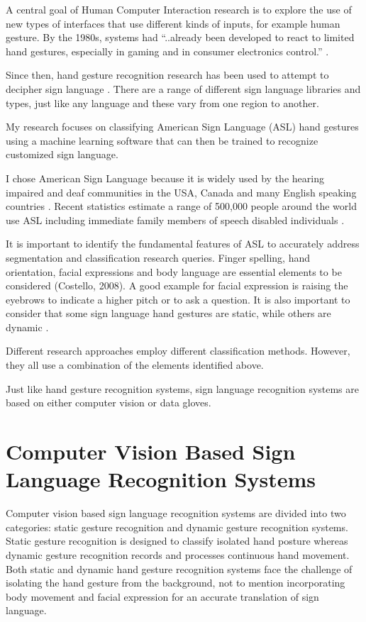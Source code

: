 A central goal of Human Computer Interaction research is to explore the use of new types of interfaces that use different kinds of inputs, for example human gesture. By the 1980s, systems had ``..already been developed to react to limited hand gestures, especially in gaming and in consumer electronics control.''  \parencite{Premaratne2007}.

Since then, hand gesture recognition research has been used to attempt to decipher sign language \parencite{Kawai1985}. There are a range of different sign language libraries and types, just like any language and these vary from one region to another.

My research focuses on classifying American Sign Language (ASL) hand gestures using a machine learning software that can then be trained to recognize customized sign language. 

I chose American Sign Language because it is widely used by the hearing impaired and deaf communities in the USA, Canada and many English speaking countries \parencite{Padden2011}. Recent statistics estimate a range of 500,000 people around the world use ASL including immediate family members of speech disabled individuals \parencite{Neidle1998}.

It is important to identify the fundamental features of ASL to accurately address segmentation and classification research queries. Finger spelling, hand orientation, facial expressions and body language are essential elements to be considered (Costello, 2008). A good example for facial expression is raising the eyebrows to indicate a higher pitch or to ask a question. It is also important to consider that some sign language hand gestures are static, while others are dynamic \parencite{Armstrong2009}. 

Different research approaches employ different classification methods. However, they all use a combination of the elements identified above.

Just like hand gesture recognition systems, sign language recognition systems are based on either computer vision or data gloves.

\section{Computer Vision Based Sign Language Recognition Systems}

Computer vision based sign language recognition systems are divided into two categories: static gesture recognition and dynamic gesture recognition \parencite{Waldron1995} systems. Static gesture recognition is designed to classify isolated hand posture whereas dynamic gesture recognition records and processes continuous hand movement. Both static and dynamic hand gesture recognition systems face the challenge of isolating the hand gesture from the background, not to mention incorporating body movement and facial expression for an accurate translation of sign language.

